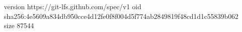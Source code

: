 version https://git-lfs.github.com/spec/v1
oid sha256:4e5609a834db950cce4d12fe0f8f004d5f774ab2849819f48cd1d1c55839b062
size 87544
